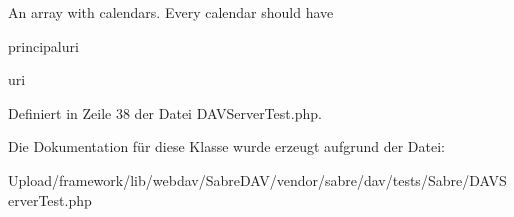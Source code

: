An array with calendars. Every calendar should have
\begin{DoxyItemize}
\item principaluri
\item uri 
\end{DoxyItemize}

Definiert in Zeile 38 der Datei D\+A\+V\+Server\+Test.\+php.



Die Dokumentation für diese Klasse wurde erzeugt aufgrund der Datei\+:\begin{DoxyCompactItemize}
\item 
Upload/framework/lib/webdav/\+Sabre\+D\+A\+V/vendor/sabre/dav/tests/\+Sabre/D\+A\+V\+Server\+Test.\+php\end{DoxyCompactItemize}

